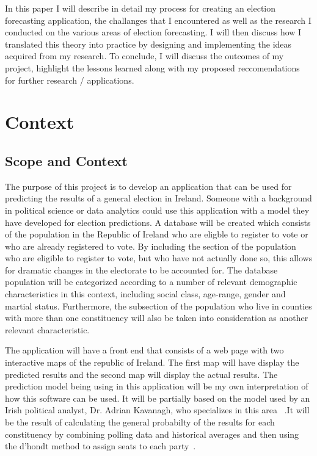 In this paper I will describe in detail my process for creating an election forecasting application, the challanges that I encountered as well as the research I conducted on the various areas of election forecasting.  I will then discuss how I translated this theory into practice by designing and implementing the ideas acquired from my research. To conclude, I will discuss the outcomes of my project, highlight the lessons learned along with my proposed reccomendations for further research / applications.

\chapter{Context}

\section{Scope and Context}
The purpose of this project is to develop an application that can be used for predicting the results of a general election in Ireland. Someone with a background in political science or data analytics could use this application with a model they have developed for election predictions. A database will be created which consists of the population in the Republic of Ireland who are eligble to register to vote or who are already registered to vote.  By including the section of the population who are eligible to register to vote, but who have not actually done so, this allows for dramatic changes in the electorate to be accounted for. The database population will be categorized according to a number of relevant demographic characteristics in this context, including  social class, age-range, gender and martial status. Furthermore, the subsection of the population who live in counties with more than one constituency will also be taken into consideration as another relevant characteristic. 

The application will have a front end that consists of a web page with two interactive maps of the republic of Ireland. The first map will have display the predicted results and the second map will display the actual results. The prediction model being using in this application will be my own interpretation of how this software can be used.  It will be partially based on the model used by an Irish political analyst, Dr. Adrian Kavanagh, who specializes in this area ~\cite{adrian}.It will be the result of  calculating the general probabilty of the results for each constituency by combining polling data and historical averages and then using the d’hondt method to assign seats to each party~\cite{adrian}.

